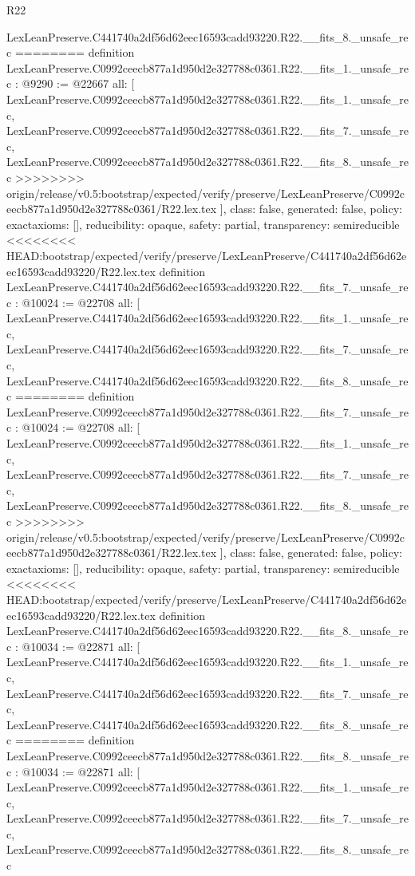 \begin{lexlean}{R22}
\begin{coremodule}
{{{{{{{{{{{{{{{{{{{{{{{{{{{{{{{{{{{{{{{{{{{{{{    LexLeanPreserve.C441740a2df56d62eec16593cadd93220.R22.__fits_8._unsafe_rec
========
definition LexLeanPreserve.C0992ceecb877a1d950d2e327788c0361.R22.__fits_1._unsafe_rec : @9290 := @22667 {
  all: [
    LexLeanPreserve.C0992ceecb877a1d950d2e327788c0361.R22.__fits_1._unsafe_rec,
    LexLeanPreserve.C0992ceecb877a1d950d2e327788c0361.R22.__fits_7._unsafe_rec,
    LexLeanPreserve.C0992ceecb877a1d950d2e327788c0361.R22.__fits_8._unsafe_rec
>>>>>>>> origin/release/v0.5:bootstrap/expected/verify/preserve/LexLeanPreserve/C0992ceecb877a1d950d2e327788c0361/R22.lex.tex
  ],
  class: false,
  generated: false,
  policy: exact{axioms: []},
  reducibility: opaque{},
  safety: partial,
  transparency: semireducible
}
<<<<<<<< HEAD:bootstrap/expected/verify/preserve/LexLeanPreserve/C441740a2df56d62eec16593cadd93220/R22.lex.tex
definition LexLeanPreserve.C441740a2df56d62eec16593cadd93220.R22.__fits_7._unsafe_rec : @10024 := @22708 {
  all: [
    LexLeanPreserve.C441740a2df56d62eec16593cadd93220.R22.__fits_1._unsafe_rec,
    LexLeanPreserve.C441740a2df56d62eec16593cadd93220.R22.__fits_7._unsafe_rec,
    LexLeanPreserve.C441740a2df56d62eec16593cadd93220.R22.__fits_8._unsafe_rec
========
definition LexLeanPreserve.C0992ceecb877a1d950d2e327788c0361.R22.__fits_7._unsafe_rec : @10024 := @22708 {
  all: [
    LexLeanPreserve.C0992ceecb877a1d950d2e327788c0361.R22.__fits_1._unsafe_rec,
    LexLeanPreserve.C0992ceecb877a1d950d2e327788c0361.R22.__fits_7._unsafe_rec,
    LexLeanPreserve.C0992ceecb877a1d950d2e327788c0361.R22.__fits_8._unsafe_rec
>>>>>>>> origin/release/v0.5:bootstrap/expected/verify/preserve/LexLeanPreserve/C0992ceecb877a1d950d2e327788c0361/R22.lex.tex
  ],
  class: false,
  generated: false,
  policy: exact{axioms: []},
  reducibility: opaque{},
  safety: partial,
  transparency: semireducible
}
<<<<<<<< HEAD:bootstrap/expected/verify/preserve/LexLeanPreserve/C441740a2df56d62eec16593cadd93220/R22.lex.tex
definition LexLeanPreserve.C441740a2df56d62eec16593cadd93220.R22.__fits_8._unsafe_rec : @10034 := @22871 {
  all: [
    LexLeanPreserve.C441740a2df56d62eec16593cadd93220.R22.__fits_1._unsafe_rec,
    LexLeanPreserve.C441740a2df56d62eec16593cadd93220.R22.__fits_7._unsafe_rec,
    LexLeanPreserve.C441740a2df56d62eec16593cadd93220.R22.__fits_8._unsafe_rec
========
definition LexLeanPreserve.C0992ceecb877a1d950d2e327788c0361.R22.__fits_8._unsafe_rec : @10034 := @22871 {
  all: [
    LexLeanPreserve.C0992ceecb877a1d950d2e327788c0361.R22.__fits_1._unsafe_rec,
    LexLeanPreserve.C0992ceecb877a1d950d2e327788c0361.R22.__fits_7._unsafe_rec,
    LexLeanPreserve.C0992ceecb877a1d950d2e327788c0361.R22.__fits_8._unsafe_rec
}}}}}}}}}}}}}}}}}}}}}}}}}}}}}}}}}}}}}}}}}}}}}}}}}
\end{coremodule}
\end{lexlean}
